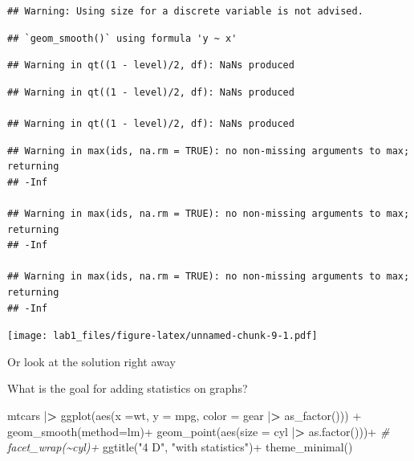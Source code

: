 \documentclass[
]{article}
\newenvironment{Shaded}{\begin{snugshade}}{\end{snugshade}}
\newcommand{\AttributeTok}[1]{\textcolor[rgb]{0.77,0.63,0.00}{#1}}
\newcommand{\CommentTok}[1]{\textcolor[rgb]{0.56,0.35,0.01}{\textit{#1}}}
\newcommand{\ErrorTok}[1]{\textcolor[rgb]{0.64,0.00,0.00}{\textbf{#1}}}
\newcommand{\FunctionTok}[1]{\textcolor[rgb]{0.00,0.00,0.00}{#1}}
\newcommand{\NormalTok}[1]{#1}
\newcommand{\SpecialCharTok}[1]{\textcolor[rgb]{0.00,0.00,0.00}{#1}}
\newcommand{\StringTok}[1]{\textcolor[rgb]{0.31,0.60,0.02}{#1}}
\begin{document}
\begin{verbatim}
## Warning: Using size for a discrete variable is not advised.
\end{verbatim}

\begin{verbatim}
## `geom_smooth()` using formula 'y ~ x'
\end{verbatim}

\begin{verbatim}
## Warning in qt((1 - level)/2, df): NaNs produced
\end{verbatim}

\begin{verbatim}
## Warning in qt((1 - level)/2, df): NaNs produced

## Warning in qt((1 - level)/2, df): NaNs produced
\end{verbatim}

\begin{verbatim}
## Warning in max(ids, na.rm = TRUE): no non-missing arguments to max; returning
## -Inf

## Warning in max(ids, na.rm = TRUE): no non-missing arguments to max; returning
## -Inf

## Warning in max(ids, na.rm = TRUE): no non-missing arguments to max; returning
## -Inf
\end{verbatim}

\texttt{[image: lab1\_files/figure-latex/unnamed-chunk-9-1.pdf]}

Or look at the solution right away

What is the goal for adding statistics on graphs?

\begin{Shaded}
\begin{Highlighting}[]
\NormalTok{mtcars }\SpecialCharTok{|}\ErrorTok{\textgreater{}} 
\FunctionTok{ggplot}\NormalTok{(}\FunctionTok{aes}\NormalTok{(}\AttributeTok{x =}\NormalTok{wt, }\AttributeTok{y =}\NormalTok{ mpg, }
           \AttributeTok{color =}\NormalTok{ gear }\SpecialCharTok{|}\ErrorTok{\textgreater{}} \FunctionTok{as\_factor}\NormalTok{())) }\SpecialCharTok{+}
    \FunctionTok{geom\_smooth}\NormalTok{(}\AttributeTok{method=}\StringTok{\textquotesingle{}lm\textquotesingle{}}\NormalTok{)}\SpecialCharTok{+}
  \FunctionTok{geom\_point}\NormalTok{(}\FunctionTok{aes}\NormalTok{(}\AttributeTok{size =}\NormalTok{ cyl }\SpecialCharTok{|}\ErrorTok{\textgreater{}} \FunctionTok{as.factor}\NormalTok{()))}\SpecialCharTok{+}
  \CommentTok{\# facet\_wrap(\textasciitilde{}cyl)+}
  \FunctionTok{ggtitle}\NormalTok{(}\StringTok{"4 D"}\NormalTok{, }\StringTok{"with statistics"}\NormalTok{)}\SpecialCharTok{+}
  \FunctionTok{theme\_minimal}\NormalTok{()}
\end{Highlighting}
\end{Shaded}
\end{document}
